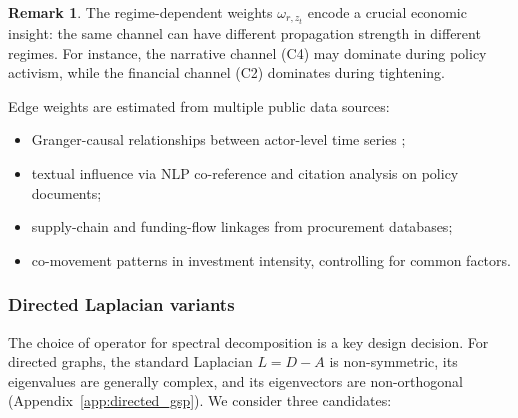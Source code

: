 \documentclass[11pt,a4paper]{article}
\theoremstyle{definition}
\newtheorem{remark}{Remark}[section]
\begin{document}
\begin{remark}
The regime-dependent weights $\omega_{r,z_t}$ encode a crucial economic insight: the same channel can have different propagation strength in different regimes. For instance, the narrative channel (C4) may dominate during policy activism, while the financial channel (C2) dominates during tightening.
\end{remark}

Edge weights are estimated from multiple public data sources:
\begin{itemize}[nosep]
  \item Granger-causal relationships between actor-level time series \citep{granger1969investigating};
  \item textual influence via NLP co-reference and citation analysis on policy documents;
  \item supply-chain and funding-flow linkages from procurement databases;
  \item co-movement patterns in investment intensity, controlling for common factors.
\end{itemize}

\subsubsection{Directed Laplacian variants}

The choice of operator for spectral decomposition is a key design decision. For directed graphs, the standard Laplacian $L = D - A$ is non-symmetric, its eigenvalues are generally complex, and its eigenvectors are non-orthogonal (Appendix~\ref{app:directed_gsp}). We consider three candidates:
\end{document}
